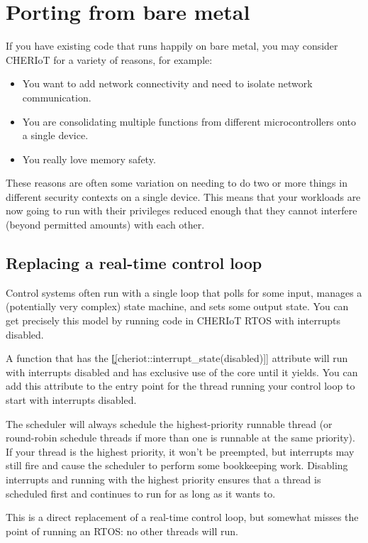 \chapter{Porting from bare metal}

If you have existing code that runs happily on bare metal, you may consider CHERIoT for a variety of reasons, for example:

\begin{itemize}
	\item{You want to add network connectivity and need to isolate network communication.}
	\item{You are consolidating multiple functions from different microcontrollers onto a single device.}
	\item{You really love memory safety.}
\end{itemize}

These reasons are often some variation on needing to do two or more things in different security contexts on a single device.
This means that your workloads are now going to run with their privileges reduced enough that they cannot interfere (beyond permitted amounts) with each other.

\section{Replacing a real-time control loop}

Control systems often run with a single loop that polls for some input, manages a (potentially very complex) state machine, and sets some output state.
You can get precisely this model by running code in CHERIoT RTOS with interrupts disabled.

A function that has the \c{[[cheriot::interrupt_state(disabled)]]} attribute will run with interrupts disabled and has exclusive use of the core until it yields.
You can add this attribute to the entry point for the thread running your control loop to start with interrupts disabled.

The scheduler will always schedule the highest-priority runnable thread (or round-robin schedule threads if more than one is runnable at the same priority).
If your thread is the highest priority, it won't be preempted, but interrupts may still fire and cause the scheduler to perform some bookkeeping work.
Disabling interrupts and running with the highest priority ensures that a thread is scheduled first and continues to run for as long as it wants to.

This is a direct replacement of a real-time control loop, but somewhat misses the point of running an RTOS: no other threads will run.

